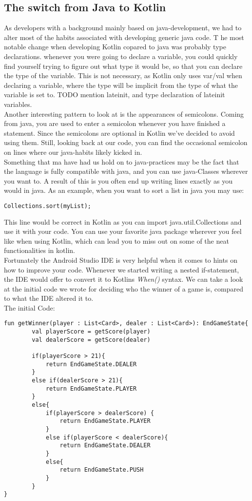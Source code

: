 \subsection{The switch from Java to Kotlin}
As developers with a background mainly based on java-development, we had to alter most of the habits associated with developing generic java code. T	he most notable change when developing Kotlin copared to java was probably type declarations. whenever you were going to declare a variable, you could quickly find yourself trying to figure out what type it would be, so that you can declare the type of the variable. This is not necessary, as Kotlin only uses var/val when declaring a variable, where the type will be implicit from the type of what the variable is set to. TODO mention lateinit, and type declaration of lateinit variables.
\\
Another interesting pattern to look at is the appearances of semicolons. Coming from java, you are used to enter a semicolon whenever you have finished a statement. Since the semicolons are optional in Kotlin we've decided to avoid using them. Still, looking back at our code, you can find the occasional semicolon on lines where our java-habits likely kicked in.\\
Something that ma have had us hold on to java-practices may be the fact that the language is fully compatible with java, and you can use java-Classes wherever you want to. A result of this is you often end up writing lines exactly as you would in java. As an example, when you want to sort a list in java you may use:
\begin{lstlisting} 
Collections.sort(myList);
\end{lstlisting}
This line would be correct in Kotlin as you can import java.util.Collections and use it with your code. You can use your favorite java package wherever you feel like when using Kotlin, which can lead you to miss out on some of the neat functionalities in kotlin.\\
Fortunately the Android Studio IDE is very helpful when it comes to hints on how to improve your code. Whenever we started writing a nested if-statement, the IDE would offer to convert it to Kotlins {\it When()} syntax. We can take a look at the initial code we wrote for deciding who the winner of a game is, compared to what the IDE altered it to.\\
The initial Code:
\begin{lstlisting}
fun getWinner(player : List<Card>, dealer : List<Card>): EndGameState{
        val playerScore = getScore(player)
        val dealerScore = getScore(dealer)

        if(playerScore > 21){
            return EndGameState.DEALER
        }
        else if(dealerScore > 21){
            return EndGameState.PLAYER
        }
        else{
            if(playerScore > dealerScore) {
                return EndGameState.PLAYER
            }
            else if(playerScore < dealerScore){
                return EndGameState.DEALER
            }
            else{
                return EndGameState.PUSH
            }
        }
} 
\end{lstlisting}
